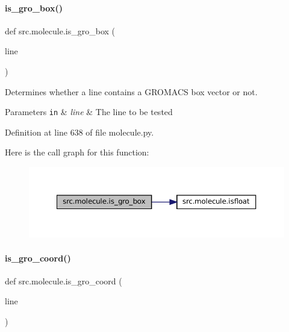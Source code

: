 \paragraph{\texorpdfstring{is\+\_\+gro\+\_\+box()}{is\_gro\_box()}}
{\footnotesize\ttfamily def src.\+molecule.\+is\+\_\+gro\+\_\+box (\begin{DoxyParamCaption}\item[{}]{line }\end{DoxyParamCaption})}



Determines whether a line contains a G\+R\+O\+M\+A\+CS box vector or not. 


\begin{DoxyParams}[1]{Parameters}
\mbox{\tt in}  & {\em line} & The line to be tested \\
\hline
\end{DoxyParams}


Definition at line 638 of file molecule.\+py.

Here is the call graph for this function\+:
\nopagebreak
\begin{figure}[H]
\begin{center}
\leavevmode
\includegraphics[width=350pt]{namespacesrc_1_1molecule_a0f007f8498ecc025f1e066d47fabfd24_cgraph}
\end{center}
\end{figure}
\mbox{\label{namespacesrc_1_1molecule_a2cf7fe49895eedd6c60b7394f1435529}} 
\paragraph{\texorpdfstring{is\+\_\+gro\+\_\+coord()}{is\_gro\_coord()}}
{\footnotesize\ttfamily def src.\+molecule.\+is\+\_\+gro\+\_\+coord (\begin{DoxyParamCaption}\item[{}]{line }\end{DoxyParamCaption})}



